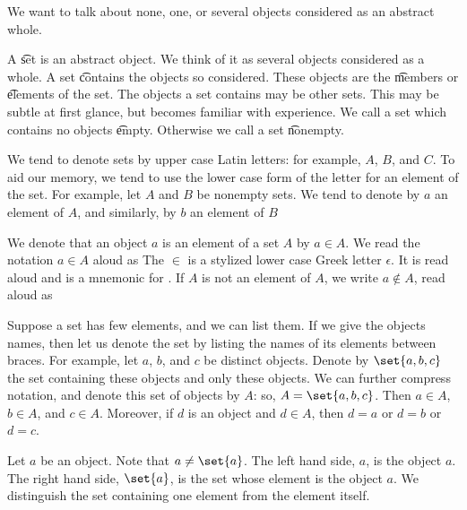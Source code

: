 
We want to talk about none, one, or several objects considered as an abstract whole.

A \t{set} is an abstract object.
We think of it as several objects considered as a whole.
A set \t{contains} the objects so considered.
These objects are the \t{members} or \t{elements} of the set.
The objects a set contains may be other sets.
This may be subtle at first glance, but becomes familiar with experience.
We call a set which contains no objects \t{empty}.
Otherwise we call a set \t{nonempty}.

We tend to denote sets by upper case Latin letters: for example, $A$, $B$, and $C$.
To aid our memory, we tend to use the lower case form of the letter for an element of the set.
For example, let $A$ and $B$ be nonempty sets.
We tend to denote by $a$ an element of $A$, and similarly, by $b$ an element of $B$

We denote that an object $a$ is an element of a set $A$ by $a \in A$.
We read the notation $a \in A$ aloud as 
The $\in$ is a stylized lower case Greek letter $\epsilon$.
It is read aloud  and is a mnemonic for .
If $A$ is not an element of $A$, we write $a \not\in A$, read aloud as 

Suppose a set has few elements, and we can list them.
If we give the objects names, then let us denote the set by listing the names of its elements between braces.
For example, let $a$, $b$, and $c$ be distinct objects.
Denote by $\set{a, b, c}$ the set containing these objects and only these objects.
We can further compress notation, and denote this set of objects by $A$: so, $A = \set{a, b, c}$.
Then $a \in A$, $b \in A$, and $c \in A$.
Moreover, if $d$ is an object and $d \in A$, then $d = a$ or $d = b$ or $d = c$.

Let $a$ be an object.
Note that $a \neq \set{a}$.
The left hand side, $a$, is the object $a$.
The right hand side, $\set{a}$, is the set whose element is the object $a$.
We distinguish the set containing one element from the element itself.


